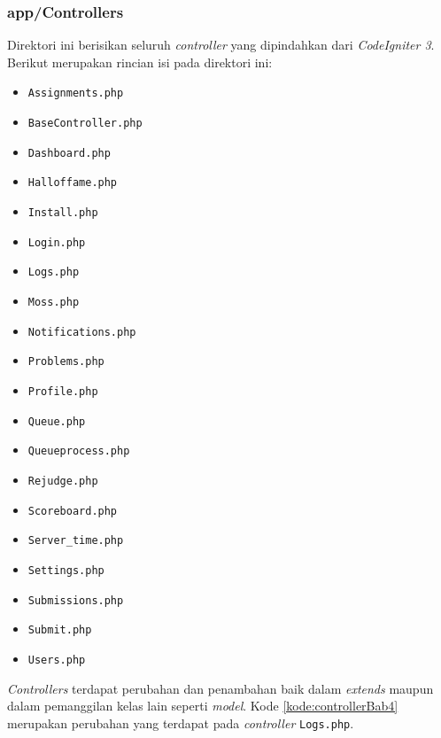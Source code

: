 	\subsubsection{app/Controllers} 
	Direktori ini berisikan seluruh \textit{controller} yang dipindahkan dari \textit{CodeIgniter 3}. Berikut merupakan rincian isi pada direktori ini:
	\begin{itemize}
		\item \texttt{Assignments.php}
		\item \texttt{BaseController.php}
		\item \texttt{Dashboard.php}
		\item \texttt{Halloffame.php}
		\item \texttt{Install.php}
		\item \texttt{Login.php}
		\item \texttt{Logs.php}
		\item \texttt{Moss.php}
		\item \texttt{Notifications.php}
		\item \texttt{Problems.php}
		\item \texttt{Profile.php}
		\item \texttt{Queue.php}
		\item \texttt{Queueprocess.php}
		\item \texttt{Rejudge.php}
		\item \texttt{Scoreboard.php}
		\item \texttt{Server\_time.php}
		\item \texttt{Settings.php}
		\item \texttt{Submissions.php}
		\item \texttt{Submit.php}
		\item \texttt{Users.php}
	\end{itemize}

\textit{Controllers} terdapat perubahan dan penambahan baik dalam \textit{extends} maupun dalam pemanggilan kelas lain seperti \textit{model}. Kode \ref{kode:controllerBab4} merupakan perubahan yang terdapat pada \textit{controller} \texttt{Logs.php}.

